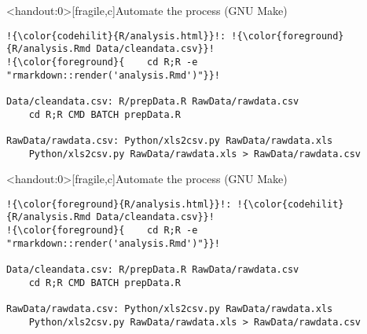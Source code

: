 \documentclass[12pt,t]{beamer}
\begin{document}
\begin{frame}<handout:0>[fragile,c]{Automate the process (GNU Make)}

\addtocounter{framenumber}{-1}

\begin{center}
\begin{minipage}[c]{10.8cm}
\begin{semiverbatim}
\begin{lstlisting}[escapechar=!,linewidth=10.8cm]
!{\color{codehilit}{R/analysis.html}}!: !{\color{foreground}{R/analysis.Rmd Data/cleandata.csv}}!
!{\color{foreground}{    cd R;R -e "rmarkdown::render('analysis.Rmd')"}}!

Data/cleandata.csv: R/prepData.R RawData/rawdata.csv
    cd R;R CMD BATCH prepData.R

RawData/rawdata.csv: Python/xls2csv.py RawData/rawdata.xls
    Python/xls2csv.py RawData/rawdata.xls > RawData/rawdata.csv
\end{lstlisting}
\end{semiverbatim}
\end{minipage}
\end{center}

\end{frame}



\begin{frame}<handout:0>[fragile,c]{Automate the process (GNU Make)}

\addtocounter{framenumber}{-1}

\begin{center}
\begin{minipage}[c]{10.8cm}
\begin{semiverbatim}
\begin{lstlisting}[escapechar=!,linewidth=10.8cm]
!{\color{foreground}{R/analysis.html}}!: !{\color{codehilit}{R/analysis.Rmd Data/cleandata.csv}}!
!{\color{foreground}{    cd R;R -e "rmarkdown::render('analysis.Rmd')"}}!

Data/cleandata.csv: R/prepData.R RawData/rawdata.csv
    cd R;R CMD BATCH prepData.R

RawData/rawdata.csv: Python/xls2csv.py RawData/rawdata.xls
    Python/xls2csv.py RawData/rawdata.xls > RawData/rawdata.csv
\end{lstlisting}
\end{semiverbatim}
\end{minipage}
\end{center}
\end{frame}
\end{document}
